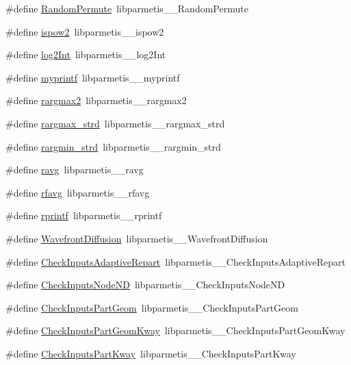 \begin{DoxyCompactItemize}
\item 
\#define \hyperlink{a00960_a7ed32008b5d3dd484f2cbe78019fcc50}{Random\+Permute}~libparmetis\+\_\+\+\_\+\+Random\+Permute
\item 
\#define \hyperlink{a00960_a873c0f49be76b6621e2e502f4267714e}{ispow2}~libparmetis\+\_\+\+\_\+ispow2
\item 
\#define \hyperlink{a00960_a996e14364a06a630e1c72ffd06175988}{log2\+Int}~libparmetis\+\_\+\+\_\+log2\+Int
\item 
\#define \hyperlink{a00960_ab850ee40138b13b7b1e7475e785f4874}{myprintf}~libparmetis\+\_\+\+\_\+myprintf
\item 
\#define \hyperlink{a00960_a7b80ec3a22ade35951c8f3f516c59359}{rargmax2}~libparmetis\+\_\+\+\_\+rargmax2
\item 
\#define \hyperlink{a00960_aa31c5afa688edc581ce8e95d10d79ad4}{rargmax\+\_\+strd}~libparmetis\+\_\+\+\_\+rargmax\+\_\+strd
\item 
\#define \hyperlink{a00960_ad1d4e84f6ea969408c5bfdd593b0f377}{rargmin\+\_\+strd}~libparmetis\+\_\+\+\_\+rargmin\+\_\+strd
\item 
\#define \hyperlink{a00960_acdb6412d5b7c7cd04baa5324d9c6c076}{ravg}~libparmetis\+\_\+\+\_\+ravg
\item 
\#define \hyperlink{a00960_a0f5952a335758e8770538fe2c2fd7081}{rfavg}~libparmetis\+\_\+\+\_\+rfavg
\item 
\#define \hyperlink{a00960_a3b7b4e93f3165aaf13d54a95101a01c4}{rprintf}~libparmetis\+\_\+\+\_\+rprintf
\item 
\#define \hyperlink{a00960_afb8b5718008fe3ebfccc56d730d20ba0}{Wavefront\+Diffusion}~libparmetis\+\_\+\+\_\+\+Wavefront\+Diffusion
\item 
\#define \hyperlink{a00960_a612ac4b7579258e864331296239c0629}{Check\+Inputs\+Adaptive\+Repart}~libparmetis\+\_\+\+\_\+\+Check\+Inputs\+Adaptive\+Repart
\item 
\#define \hyperlink{a00960_a04b2c7cbe75c773f129d5cc689646f37}{Check\+Inputs\+Node\+ND}~libparmetis\+\_\+\+\_\+\+Check\+Inputs\+Node\+ND
\item 
\#define \hyperlink{a00960_ab55fca2e7710092b18778689ed074594}{Check\+Inputs\+Part\+Geom}~libparmetis\+\_\+\+\_\+\+Check\+Inputs\+Part\+Geom
\item 
\#define \hyperlink{a00960_afce54a66b88eca3f8cbecbbde7e89e59}{Check\+Inputs\+Part\+Geom\+Kway}~libparmetis\+\_\+\+\_\+\+Check\+Inputs\+Part\+Geom\+Kway
\item 
\#define \hyperlink{a00960_abcfe1d31f003805011323c396c39d92e}{Check\+Inputs\+Part\+Kway}~libparmetis\+\_\+\+\_\+\+Check\+Inputs\+Part\+Kway

\end{DoxyCompactItemize}

